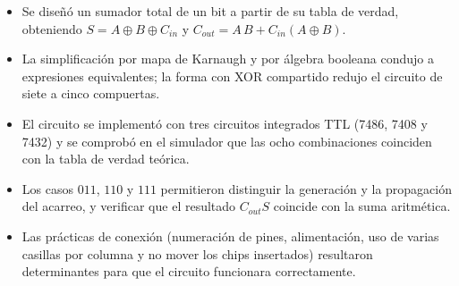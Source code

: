 \documentclass[10pt]{article}
\begin{document}
\begin{itemize}
  \item Se diseñó un sumador total de un bit a partir de su tabla de verdad,
        obteniendo $S = A\oplus B\oplus C_{in}$ y
        $C_{out} = A\,B + C_{in}(A\oplus B)$.
  \item La simplificación por mapa de Karnaugh y por álgebra booleana condujo a
        expresiones equivalentes; la forma con XOR compartido redujo el circuito
        de siete a cinco compuertas.
  \item El circuito se implementó con tres circuitos integrados TTL (7486, 7408
        y 7432) y se comprobó en el simulador que las ocho combinaciones
        coinciden con la tabla de verdad teórica.
  \item Los casos $011$, $110$ y $111$ permitieron distinguir la generación y
        la propagación del acarreo, y verificar que el resultado $C_{out}S$
        coincide con la suma aritmética.
  \item Las prácticas de conexión (numeración de pines, alimentación, uso de
        varias casillas por columna y no mover los chips insertados) resultaron
        determinantes para que el circuito funcionara correctamente.
\end{itemize}
\end{document}
